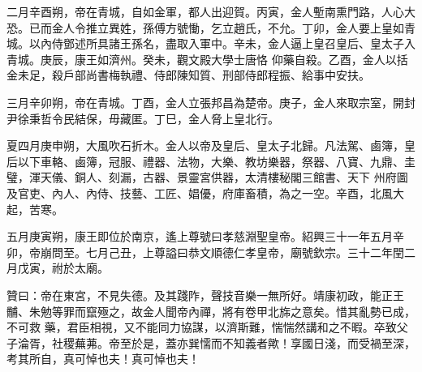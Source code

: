 \begin{pinyinscope}
 二月辛酉朔，帝在青城，自如金軍，都人出迎賀。丙寅，金人塹南熏門路，人心大恐。已而金人令推立異姓，孫傅方號慟，乞立趙氏，不允。丁卯，金人要上皇如青城。以內侍鄧述所具諸王孫名，盡取入軍中。辛未，金人逼上皇召皇后、皇太子入青城。庚辰，康王如濟州。癸未，觀文殿大學士唐恪
 仰藥自殺。乙酉，金人以括金未足，殺戶部尚書梅執禮、侍郎陳知質、刑部侍郎程振、給事中安扶。



 三月辛卯朔，帝在青城。丁酉，金人立張邦昌為楚帝。庚子，金人來取宗室，開封尹徐秉哲令民結保，毋藏匿。丁巳，金人脅上皇北行。



 夏四月庚申朔，大風吹石折木。金人以帝及皇后、皇太子北歸。凡法駕、鹵簿，皇后以下車輅、鹵簿，冠服、禮器、法物，大樂、教坊樂器，祭器、八寶、九鼎、圭璧，渾天儀、銅人、刻漏，古器、景靈宮供器，太清樓秘閣三館書、天下
 州府圖及官吏、內人、內侍、技藝、工匠、娼優，府庫畜積，為之一空。辛酉，北風大起，苦寒。



 五月庚寅朔，康王即位於南京，遙上尊號曰孝慈淵聖皇帝。紹興三十一年五月辛卯，帝崩問至。七月己丑，上尊謚曰恭文順德仁孝皇帝，廟號欽宗。三十二年閏二月戊寅，祔於太廟。



 贊曰：帝在東宮，不見失德。及其踐阼，聲技音樂一無所好。靖康初政，能正王黼、朱勉等罪而竄殛之，故金人聞帝內禪，將有卷甲北旆之意矣。惜其亂勢已成，不可救
 藥，君臣相視，又不能同力協謀，以濟斯難，惴惴然講和之不暇。卒致父子淪胥，社稷蕪茀。帝至於是，蓋亦巽懦而不知義者歟！享國日淺，而受禍至深，考其所自，真可悼也夫！真可悼也夫！



\end{pinyinscope}
